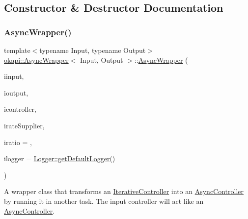 \subsection{Constructor \& Destructor Documentation}
\mbox{\label{classokapi_1_1AsyncWrapper_adbbf06146d19a3fd5747f6ddd8bc084e}} 
\subsubsection{\texorpdfstring{AsyncWrapper()}{AsyncWrapper()}\hspace{0.1cm}{\footnotesize\ttfamily [1/2]}}
{\footnotesize\ttfamily template$<$typename Input, typename Output$>$ \\
\mbox{\hyperlink{classokapi_1_1AsyncWrapper}{okapi\+::\+Async\+Wrapper}}$<$ Input, Output $>$\+::\mbox{\hyperlink{classokapi_1_1AsyncWrapper}{Async\+Wrapper}} (\begin{DoxyParamCaption}\item[{const std\+::shared\+\_\+ptr$<$ \mbox{\hyperlink{classokapi_1_1ControllerInput}{Controller\+Input}}$<$ Input $>$$>$ \&}]{iinput,  }\item[{const std\+::shared\+\_\+ptr$<$ \mbox{\hyperlink{classokapi_1_1ControllerOutput}{Controller\+Output}}$<$ Output $>$$>$ \&}]{ioutput,  }\item[{std\+::unique\+\_\+ptr$<$ \mbox{\hyperlink{classokapi_1_1IterativeController}{Iterative\+Controller}}$<$ Input, Output $>$$>$}]{icontroller,  }\item[{const \mbox{\hyperlink{classokapi_1_1Supplier}{Supplier}}$<$ std\+::unique\+\_\+ptr$<$ \mbox{\hyperlink{classokapi_1_1AbstractRate}{Abstract\+Rate}} $>$$>$ \&}]{irate\+Supplier,  }\item[{const double}]{iratio = {},  }\item[{const std\+::shared\+\_\+ptr$<$ \mbox{\hyperlink{classokapi_1_1Logger}{Logger}} $>$ \&}]{ilogger = {\ttfamily \mbox{\hyperlink{classokapi_1_1Logger_a5053cf778b4b55acba788a3797dc96d2}{Logger\+::get\+Default\+Logger}}()} }\end{DoxyParamCaption})\hspace{0.3cm}{\ttfamily [inline]}}

A wrapper class that transforms an \mbox{\hyperlink{classokapi_1_1IterativeController}{Iterative\+Controller}} into an \mbox{\hyperlink{classokapi_1_1AsyncController}{Async\+Controller}} by running it in another task. The input controller will act like an \mbox{\hyperlink{classokapi_1_1AsyncController}{Async\+Controller}}.


